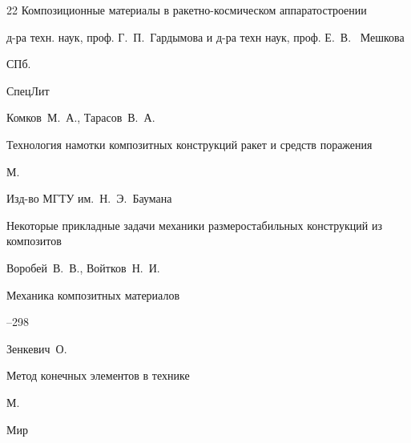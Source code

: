 \begin{thebibliography}{22}
\book Композиционные материалы в ракетно-космическом аппаратостроении

\eds д-ра техн. наук, проф. Г.~П.~Гардымова и д-ра техн наук, проф. Е.~В.~ Мешкова

\publaddr СПб.

\publ СпецЛит







\by Комков~М.~А., Тарасов~В.~А.

\book Технология намотки композитных конструкций ракет и средств поражения

\publaddr М.

\publ Изд-во МГТУ им.~Н.~Э.~Баумана







\paper Некоторые прикладные задачи механики  размеростабильных конструкций из композитов

\by Воробей~В.~В., Войтков~Н.~И.

\jour Механика композитных материалов



--298





\by Зенкевич~О.

\book Метод конечных элементов в технике

\publaddr М.

\publ Мир






\end{thebibliography}
